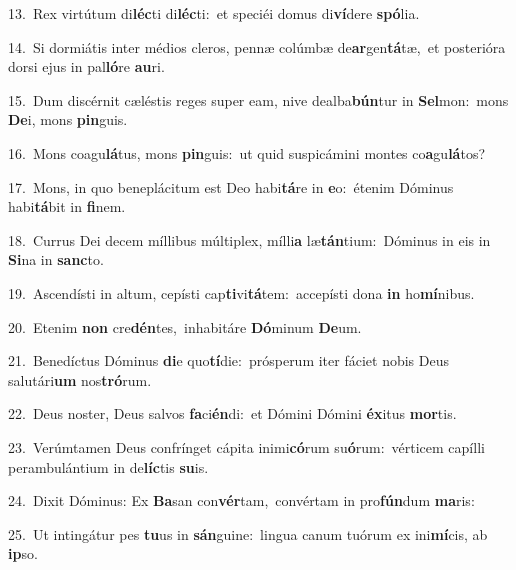 {\numbfont\textcolor{\numbcolor}{13.}}~Rex virtútum di\-\textbf{léc}\-ti di\-\textbf{léc}\-ti:~\star et speciéi domus di\-\textbf{ví}\-dere \textbf{spó}\-lia.\par
{\numbfont\textcolor{\numbcolor}{14.}}~Si dormiátis inter médios cleros, pennæ colúmbæ de\-\textbf{ar}\-gen\-\textbf{tá}\-tæ,~\star et posterióra dorsi ejus in pal\-\textbf{ló}\-re \textbf{au}\-ri.\par
{\numbfont\textcolor{\numbcolor}{15.}}~Dum discérnit cæléstis reges super eam, nive dealba\-\textbf{bún}\-tur in \textbf{Sel}\-mon:~\star mons \textbf{De}\-i, mons \textbf{pin}\-guis.\par
{\numbfont\textcolor{\numbcolor}{16.}}~Mons coagu\-\textbf{lá}\-tus, mons \textbf{pin}\-guis:~\star ut quid suspicámini montes co\-\textbf{a}\-gu\-\textbf{lá}\-tos?\par
{\numbfont\textcolor{\numbcolor}{17.}}~Mons, in quo beneplácitum est Deo habi\-\textbf{tá}\-re in \textbf{e}\-o:~\star étenim Dóminus habi\-\textbf{tá}\-bit in \textbf{fi}\-nem.\par
{\numbfont\textcolor{\numbcolor}{18.}}~Currus Dei decem míllibus múltiplex, mílli\textbf{a} læ\-\textbf{tán}\-tium:~\star Dóminus in eis in \textbf{Si}\-na in \textbf{sanc}\-to.\par
{\numbfont\textcolor{\numbcolor}{19.}}~Ascendísti in altum, cepísti cap\-\textbf{ti}\-vi\-\textbf{tá}\-tem:~\star accepísti dona \textbf{in} ho\-\textbf{mí}\-nibus.\par
{\numbfont\textcolor{\numbcolor}{20.}}~Etenim \textbf{non} cre\-\textbf{dén}\-tes,~\star inhabitáre \textbf{Dó}\-minum \textbf{De}\-um.\par
{\numbfont\textcolor{\numbcolor}{21.}}~Benedíctus Dóminus \textbf{di}\-e quo\-\textbf{tí}\-die:~\star prósperum iter fáciet nobis Deus salutári\textbf{um} nos\-\textbf{tró}\-rum.\par
{\numbfont\textcolor{\numbcolor}{22.}}~Deus noster, Deus salvos \textbf{fa}\-ci\-\textbf{én}\-di:~\star et Dómini Dómini \textbf{éx}\-itus \textbf{mor}\-tis.\par
{\numbfont\textcolor{\numbcolor}{23.}}~Verúmtamen Deus confrínget cápita inimi\-\textbf{có}\-rum su\-\textbf{ó}\-rum:~\star vérticem capílli perambulántium in de\-\textbf{líc}\-tis \textbf{su}\-is.\par
{\numbfont\textcolor{\numbcolor}{24.}}~Dixit Dóminus: Ex \textbf{Ba}\-san con\-\textbf{vér}\-tam,~\star convértam in pro\-\textbf{fún}\-dum \textbf{ma}\-ris:\par
{\numbfont\textcolor{\numbcolor}{25.}}~Ut intingátur pes \textbf{tu}\-us in \textbf{sán}\-guine:~\star lingua canum tuórum ex ini\-\textbf{mí}\-cis, ab \textbf{ip}\-so.\par
